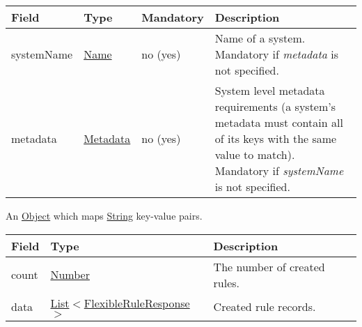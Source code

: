 \documentclass[a4paper]{arrowhead}
\newcommand{\pref}[1]{{\textcolor{ArrowheadGrey}{\hyperref[sec:model:primitives:#1]{#1}}}}
\begin{document}
\label{sec:model:SystemDescriptor}

\begin{table}[ht!]
\begin{tabularx}{\textwidth}{| p{3cm} | p{3cm} | p{2cm} | X |} \hline
\rowcolor{gray!33} Field & Type & Mandatory & Description \\ \hline
systemName & \pref{Name} & no (yes) & Name of a system. Mandatory if \textit{metadata} is not specified. \\ \hline
metadata & \hyperref[sec:model:Metadata]{Metadata} & no (yes) & System level metadata requirements (a system's metadata must contain all of its keys with the same value to match). Mandatory if \textit{systemName} is not specified. \\ \hline
\end{tabularx}
\end{table}


\label{sec:model:Metadata}

An \pref{Object} which maps \pref{String} key-value pairs.

\label{sec:model:FlexibleRuleListResponse}
 
\begin{table}[ht!]
\begin{tabularx}{\textwidth}{| p{2cm} | p{5.0cm} | X |} \hline
\rowcolor{gray!33} Field & Type      & Description \\ \hline
count & \pref{Number} & The number of created rules. \\ \hline
data & \pref{List}$<$\hyperref[sec:model:FlexibleRuleResponse]{FlexibleRuleResponse}$>$ & Created rule records. \\ \hline
\end{tabularx}
\end{table}

\label{sec:model:FlexibleRuleResponse}
\end{document}
